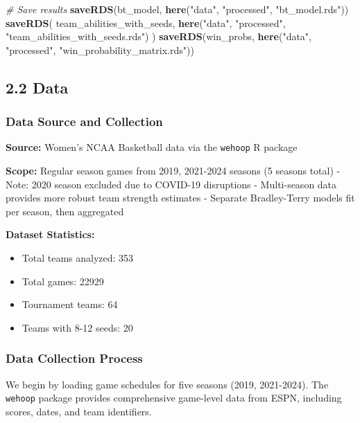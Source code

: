 \documentclass[
]{article}
\newenvironment{Shaded}{\begin{snugshade}}{\end{snugshade}}
\newcommand{\CommentTok}[1]{\textcolor[rgb]{0.56,0.35,0.01}{\textit{#1}}}
\newcommand{\FunctionTok}[1]{\textcolor[rgb]{0.13,0.29,0.53}{\textbf{#1}}}
\newcommand{\NormalTok}[1]{#1}
\newcommand{\StringTok}[1]{\textcolor[rgb]{0.31,0.60,0.02}{#1}}
\providecommand{\tightlist}{%
  \setlength{\itemsep}{0pt}\setlength{\parskip}{0pt}}
\begin{document}
\begin{Shaded}
\begin{Highlighting}[]
\CommentTok{\# Save results}
\FunctionTok{saveRDS}\NormalTok{(bt\_model, }\FunctionTok{here}\NormalTok{(}\StringTok{"data"}\NormalTok{, }\StringTok{"processed"}\NormalTok{, }\StringTok{"bt\_model.rds"}\NormalTok{))}
\FunctionTok{saveRDS}\NormalTok{(}
\NormalTok{    team\_abilities\_with\_seeds,}
    \FunctionTok{here}\NormalTok{(}\StringTok{"data"}\NormalTok{, }\StringTok{"processed"}\NormalTok{, }\StringTok{"team\_abilities\_with\_seeds.rds"}\NormalTok{)}
\NormalTok{)}
\FunctionTok{saveRDS}\NormalTok{(win\_probs, }\FunctionTok{here}\NormalTok{(}\StringTok{"data"}\NormalTok{, }\StringTok{"processed"}\NormalTok{, }\StringTok{"win\_probability\_matrix.rds"}\NormalTok{))}
\end{Highlighting}
\end{Shaded}

\subsection{2.2 Data}\label{data}

\subsubsection{Data Source and
Collection}\label{data-source-and-collection}

\textbf{Source:} Women's NCAA Basketball data via the \texttt{wehoop} R
package

\textbf{Scope:} Regular season games from 2019, 2021-2024 seasons (5
seasons total) - Note: 2020 season excluded due to COVID-19 disruptions
- Multi-season data provides more robust team strength estimates -
Separate Bradley-Terry models fit per season, then aggregated

\textbf{Dataset Statistics:}

\begin{itemize}
\tightlist
\item
  Total teams analyzed: 353
\item
  Total games: 22929
\item
  Tournament teams: 64
\item
  Teams with 8-12 seeds: 20
\end{itemize}

\subsubsection{Data Collection Process}\label{data-collection-process}

We begin by loading game schedules for five seasons (2019, 2021-2024).
The \texttt{wehoop} package provides comprehensive game-level data from
ESPN, including scores, dates, and team identifiers.
\end{document}
